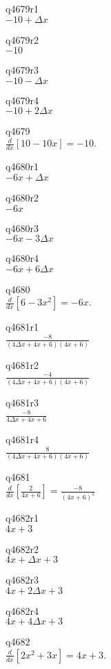 q4679r1\\
\(\displaystyle -10 + \Delta x \)

q4679r2\\
\(\displaystyle -10 \)

q4679r3\\
\(\displaystyle -10-\Delta x \)

q4679r4\\
\(\displaystyle -10+2\Delta x \)

q4679\\
\(\displaystyle \frac{d}{dx} [10-10x] = -10. \)

q4680r1\\
\(\displaystyle -6x + \Delta x \)

q4680r2\\
\(\displaystyle -6x \)

q4680r3\\
\(\displaystyle -6x - 3\Delta x \)

q4680r4\\
\(\displaystyle -6x + 6\Delta x \)

q4680\\
\(\displaystyle \frac{d}{dx}[6 - 3x^2] = -6x. \)

q4681r1\\
\(\displaystyle \frac{-8}{(4\Delta x + 4x + 6)(4x + 6)} \)

q4681r2\\
\(\displaystyle \frac{-4}{(4\Delta x + 4x + 6)(4x + 6)} \)

q4681r3\\
\(\displaystyle \frac{-8}{4\Delta x + 4x + 6} \)

q4681r4\\
\(\displaystyle \frac{8}{(4\Delta x + 4x + 6)(4x + 6)} \)

q4681\\
\(\displaystyle \frac{d}{dx} \left [ \frac{2}{4x + 6} \right ] = \frac{-8}{(4x + 6)^2} \)

q4682r1\\
\(\displaystyle 4x + 3 \)

q4682r2\\
\(\displaystyle 4x + \Delta x + 3 \)

q4682r3\\
\(\displaystyle 4x + 2\Delta x + 3 \)

q4682r4\\
\(\displaystyle 4x + 4\Delta x + 3 \)

q4682\\
\(\displaystyle \frac{d}{dx} [2x^2 + 3x] = 4x+3. \)

